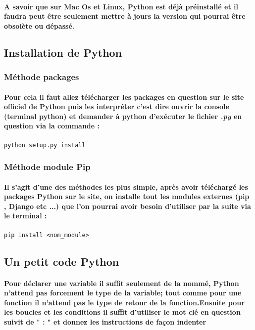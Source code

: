 \documentclass[a4paper, 12pt, twoside]{article}
\begin{document}
\paragraph{A savoir que sur Mac Os et Linux, Python est déjà préinstallé et il faudra peut être seulement mettre à jours la version qui pourrai être obsolète ou dépassé.}

\subsection{Installation de Python} 
\subsubsection{Méthode packages}
\paragraph{Pour cela il faut allez télécharger les packages en question sur le site officiel de Python puis les interpréter c'est dire ouvrir la console (terminal python) et demander à python d'exécuter le fichier \textit{.py} en question via la commande :}
\begin{verbatim}
python setup.py install
\end{verbatim} 

\subsubsection{Méthode module Pip} 
\paragraph{Il s'agit d'une des méthodes les plus simple, après avoir téléchargé les packages Python sur le site, on installe tout les modules externes (pip , Django etc ...)  que l'on pourrai avoir besoin d'utiliser par la suite via le terminal : }
\begin{verbatim}
pip install <nom_module>
\end{verbatim}

\subsection{Un petit code Python}

\paragraph{Pour déclarer une variable il suffit seulement de la nommé, Python n'attend pas forcement le type de la variable; tout comme pour une fonction il n'attend pas le type de retour de la fonction.Ensuite pour les boucles et les conditions il suffit d'utiliser le mot clé en question suivit de " : " et donnez les instructions de façon indenter}
\end{document}
